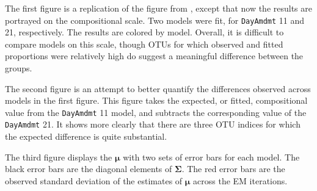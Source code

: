 \documentclass{template}
\begin{document}
The first figure is a replication of the figure from \cite{xia2013logistic}, except that now the results are portrayed on the compositional scale. Two models were fit, for \texttt{DayAmdmt} 11 and 21, respectively. The results are colored by model. Overall, it is difficult to compare models on this scale, though OTUs for which observed and fitted proportions were relatively high do suggest a meaningful difference between the groups.


The second figure is an attempt to better quantify the differences observed across models in the first figure. This figure takes the expected, or fitted, compositional value from the \texttt{DayAmdmt} 11  model, and subtracts the corresponding value of the \texttt{DayAmdmt} 21. It shows more clearly that there are three OTU indices for which the expected difference  is quite substantial.


The third figure displays the $\boldsymbol{\mu}$ with two sets of error bars for each model. The black error bars are the diagonal elements of $\boldsymbol{\Sigma}$. The red error bars are the observed standard deviation of the estimates of $\boldsymbol{\mu}$ across the EM iterations.





\end{document}
